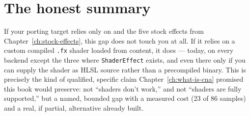 \section{The honest summary}

If your porting target relies only on  and the five stock effects from
Chapter~\ref{ch:stock-effects}, this gap does not touch you at all. If it relies on a custom
compiled \texttt{.fx} shader loaded from content, it does --- today, on every backend except
the three where \texttt{ShaderEffect} exists, and even there only if you can supply the
shader as HLSL source rather than a precompiled binary. This is precisely the kind of
qualified, specific claim Chapter~\ref{ch:what-is-cna} promised this book would preserve:
not ``shaders don't work,'' and not ``shaders are fully supported,'' but a named, bounded gap
with a measured cost (23 of 86 samples) and a real, if partial, alternative already built.
